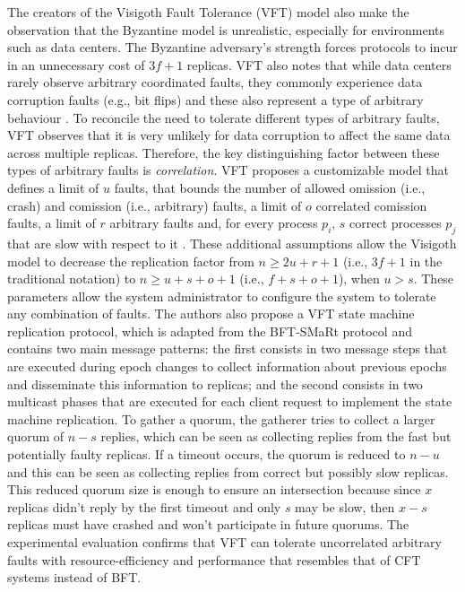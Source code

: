 \documentclass[runningheads,a4paper]{llncs}
\begin{document}
The creators of the Visigoth Fault Tolerance (VFT) model also make the observation that the Byzantine model is unrealistic, especially for environments such as data centers. The Byzantine adversary's strength forces protocols to incur in an unnecessary cost of $3f+1$ replicas. VFT also notes that while data centers rarely observe arbitrary coordinated faults, they commonly experience data corruption faults (e.g., bit flips) and these also represent a type of arbitrary behaviour \cite{AmazonS31}\cite{AmazonS32}. To reconcile the need to tolerate different types of arbitrary faults, VFT observes that it is very unlikely for data corruption to affect the same data across multiple replicas. Therefore, the key distinguishing factor between these types of arbitrary faults is \textit{correlation}. VFT proposes a customizable model that defines a limit of $u$ faults, that bounds the number of allowed omission (i.e., crash) and comission (i.e., arbitrary) faults, a limit of $o$ correlated comission faults, a limit of $r$ arbitrary faults and, for every process $p_i$, $s$ correct processes $p_j$ that are slow with respect to it \cite{Porto2015}. These additional assumptions allow the Visigoth model to decrease the replication factor from $n \geq 2u+r+1$ (i.e., $3f+1$ in the traditional notation) to $n \geq u+s+o+1$ (i.e., $f+s+o+1$), when $u > s$. These parameters allow the system administrator to configure the system to tolerate any combination of faults. The authors also propose a VFT state machine replication protocol, which is adapted from the BFT-SMaRt protocol and contains two main message patterns: the first consists in two message steps that are executed during epoch changes to collect information about previous epochs and disseminate this information to replicas; and the second consists in two multicast phases that are executed for each client request to implement the state machine replication. To gather a quorum, the gatherer tries to collect a larger quorum of $n-s$ replies, which can be seen as collecting replies from the fast but potentially faulty replicas. If a timeout occurs, the quorum is reduced to $n-u$ and this can be seen as collecting replies from correct but possibly slow replicas. This reduced quorum size is enough to ensure an intersection because since $x$ replicas didn't reply by the first timeout and only $s$ may be slow, then $x-s$ replicas must have crashed and won't participate in future quorums. The experimental evaluation confirms that VFT can tolerate uncorrelated arbitrary faults with resource-efficiency and performance that resembles that of CFT systems instead of BFT. \par
\end{document}
